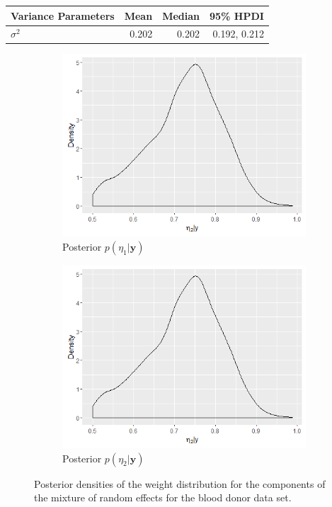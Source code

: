 \begin{table}[htb]
\begin{tabular}{@{}lrrr@{}}
\toprule
Variance Parameters & Mean & Median & 95\% HPDI \\ \midrule
$\sigma^2$ & 0.202 & 0.202 & 0.192, 0.212\\ \bottomrule
\end{tabular}
\end{table}

\begin{figure}[!htb]
\centering
\captionsetup{justification=centering}
\begin{subfigure}[b]{0.4\textwidth}
		\includegraphics[width=\textwidth]{mainmatter/chapter_6_blood_donor/eta1.png}
        \caption{\label{fig : eta_blood_donor_1} Posterior $p(\eta_1|\boldsymbol{y})$}
	\end{subfigure}
	\begin{subfigure}[b]{0.4\textwidth}
		\includegraphics[width=\textwidth]{mainmatter/chapter_6_blood_donor/eta2.png}	
          \caption{\label{fig : eta_blood_donor_2}Posterior $p(\eta_2|\boldsymbol{y})$}
	\end{subfigure}	
	\caption{Posterior densities of the weight distribution for the components of the mixture of random effects for the blood donor data set.}
	\label{fig : eta_blood_donor}    
\end{figure} 


